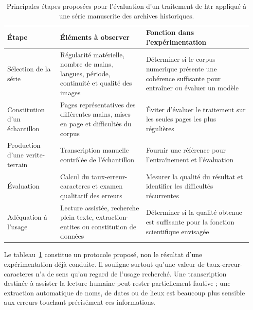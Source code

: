 \begin{table}[htbp]
	\centering
	\small
	\begin{tabular}{p{} p{} p{}}
		\toprule
		\textbf{Étape} &
		\textbf{Éléments à observer} &
		\textbf{Fonction dans l'expérimentation} \\
		\midrule
		
		Sélection de la série
		& Régularité matérielle, nombre de mains, langues, période, continuité et qualité des images
		& Déterminer si le \gls{corpus-numerique} présente une cohérence suffisante pour entraîner ou évaluer un modèle \\
		
		Constitution d'un échantillon
		& Pages représentatives des différentes mains, mises en page et difficultés du corpus
		& Éviter d'évaluer le traitement sur les seules pages les plus régulières \\
		
		Production d'une \gls{verite-terrain}
		& Transcription manuelle contrôlée de l'échantillon
		& Fournir une référence pour l'entraînement et l'évaluation \\
		
		Évaluation
		& Calcul du \gls{taux-erreur-caracteres} et examen qualitatif des erreurs
		& Mesurer la qualité du résultat et identifier les difficultés récurrentes \\
		
		Adéquation à l'usage
		& Lecture assistée, recherche plein texte, \gls{extraction-entites} ou constitution de données
		& Déterminer si la qualité obtenue est suffisante pour la fonction scientifique envisagée \\
		
		\bottomrule
	\end{tabular}
	
	\caption[Protocole possible d'évaluation d'un traitement HTR]
	{Principales étapes proposées pour l'évaluation d'un traitement de \gls{htr} appliqué à une série manuscrite des archives historiques.}
	\label{tab:protocole-htr}
\end{table}

Le tableau~\ref{tab:protocole-htr} constitue un protocole proposé, non le résultat d'une expérimentation déjà conduite. Il souligne surtout qu'une valeur de \gls{taux-erreur-caracteres} n'a de sens qu'au regard de l'usage recherché. Une transcription destinée à assister la lecture humaine peut rester partiellement fautive ; une extraction automatique de noms, de dates ou de lieux est beaucoup plus sensible aux erreurs touchant précisément ces informations.

